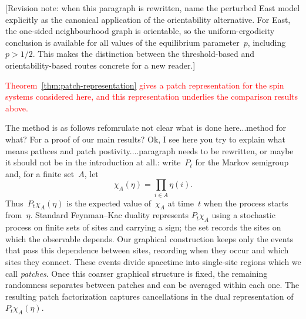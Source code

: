 \textcolor{revisionpurple}{[Revision note: when this paragraph is rewritten,
name the perturbed East model explicitly as the canonical application of the
orientability alternative. For East, the one-sided neighbourhood graph is
orientable, so the uniform-ergodicity conclusion is available for all values of
the equilibrium parameter~$p$, including~$p>1/2$. This makes the distinction
between the threshold-based and orientability-based routes concrete for a new
reader.]}

%
%

\textcolor{red}{Theorem~\ref{thm:patch-representation} gives a patch
representation for the spin systems considered here, and this representation
underlies the comparison results above.}

The method is as follows {\gm refomrulate not clear what is done here...method for what? For a proof of our main results? Ok, I see here you try to explain what means pathces and patch postivity....paragraph needs to be rewritten, or maybe it should not be in the introduction at all.}: write~$P_t$ for the Markov semigroup and, for a finite set~$A$, let
\begin{equation*}
\chi_A(\eta)=\prod_{i\in A}\eta(i).
\end{equation*}
Thus~$P_t\chi_A(\eta)$ is the expected value of~$\chi_A$ at time~$t$ when the
process starts from~$\eta$. Standard Feynman--Kac duality represents
$P_t\chi_A$ using a stochastic process on finite sets of sites and carrying a sign; the set records the
sites on which the observable depends. Our graphical construction
keeps only the events that pass this dependence between sites, recording when
they occur and which sites they connect. These events divide spacetime into single-site regions which we call \emph{patches}. Once this coarser graphical structure
is fixed, the remaining randomness separates between patches and can be
averaged within each one. The resulting patch factorization captures cancellations in the dual representation of~$P_t\chi_A(\eta)$.

